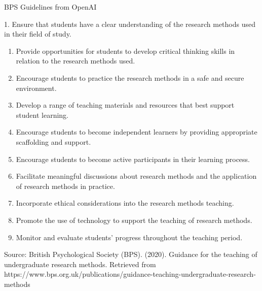 \documentclass[
  11pt,
  letterpaper,
  oneside,
  open=any]{scrbook}
\begin{document}
BPS Guidelines from OpenAI

1. Ensure that students have a clear understanding of the research
methods used in their field of study.

\begin{enumerate}
\def\labelenumi{\arabic{enumi}.}
\setcounter{enumi}{1}
\item
  Provide opportunities for students to develop critical thinking skills
  in relation to the research methods used.
\item
  Encourage students to practice the research methods in a safe and
  secure environment.
\item
  Develop a range of teaching materials and resources that best support
  student learning.
\item
  Encourage students to become independent learners by providing
  appropriate scaffolding and support.
\item
  Encourage students to become active participants in their learning
  process.
\item
  Facilitate meaningful discussions about research methods and the
  application of research methods in practice.
\item
  Incorporate ethical considerations into the research methods teaching.
\item
  Promote the use of technology to support the teaching of research
  methods.
\item
  Monitor and evaluate students' progress throughout the teaching
  period.
\end{enumerate}

Source: British Psychological Society (BPS). (2020). Guidance for the
teaching of undergraduate research methods. Retrieved from
https://www.bps.org.uk/publications/guidance-teaching-undergraduate-research-methods
\end{document}
